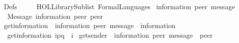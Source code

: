 %
\begin{isabellebody}%
%
%
\isadelimtheory
\isanewline
\isanewline
%
\endisadelimtheory
%
\isatagtheory
{}\isamarkupfalse%
\ Defs\isanewline
\ \ \ \ \ {\isachardoublequoteopen}HOL{\isacharminus}{\kern0pt}Library{\isachardot}{\kern0pt}Sublist{\isachardoublequoteclose}\ FormalLanguages\isanewline
{}%
\endisatagtheory
{\isafoldtheory}%
%
\isadelimtheory
%
\endisadelimtheory
%
\isadelimdocument
%
\endisadelimdocument
%
\isatagdocument
%
\isamarkuptrue%
%
\isamarkuptrue%
%
\isamarkuptrue%
%
\endisatagdocument
{\isafolddocument}%
%
\isadelimdocument
%
\endisadelimdocument
{}\isamarkupfalse%
\ {\isacharparenleft}{\kern0pt}{\isacharprime}{\kern0pt}information{\isacharcomma}{\kern0pt}\ {\isacharprime}{\kern0pt}peer{\isacharparenright}{\kern0pt}\ message\ {\isacharequal}{\kern0pt}\isanewline
\ \ Message\ {\isacharprime}{\kern0pt}information\ {\isacharprime}{\kern0pt}peer\ {\isacharprime}{\kern0pt}peer\ \ {\isacharparenleft}{\kern0pt}{\isachardoublequoteopen}{\isacharunderscore}{\kern0pt}\isactrlbsup {\isacharunderscore}{\kern0pt}{\isasymrightarrow}{\isacharunderscore}{\kern0pt}\isactrlesup {\isachardoublequoteclose}\ {\isacharbrackleft}{\kern0pt}{}{}{}{\isacharcomma}{\kern0pt}\ {}{}{}{\isacharcomma}{\kern0pt}\ {}{}{}{\isacharbrackright}{\kern0pt}\ {}{}{}{\isacharparenright}{\kern0pt}\isanewline
\isanewline
{}\isamarkupfalse%
\ get{\isacharunderscore}{\kern0pt}information\ {\isacharcolon}{\kern0pt}{\isacharcolon}{\kern0pt}\ {\isachardoublequoteopen}{\isacharparenleft}{\kern0pt}{\isacharprime}{\kern0pt}information{\isacharcomma}{\kern0pt}\ {\isacharprime}{\kern0pt}peer{\isacharparenright}{\kern0pt}\ message\ {\isasymRightarrow}\ {\isacharprime}{\kern0pt}information{\isachardoublequoteclose}\ \isanewline
\ \ {\isachardoublequoteopen}get{\isacharunderscore}{\kern0pt}information\ {\isacharparenleft}{\kern0pt}i\isactrlbsup p{\isasymrightarrow}q\isactrlesup {\isacharparenright}{\kern0pt}\ {\isacharequal}{\kern0pt}\ i{\isachardoublequoteclose}\isanewline
\isanewline
{}\isamarkupfalse%
\ get{\isacharunderscore}{\kern0pt}sender\ {\isacharcolon}{\kern0pt}{\isacharcolon}{\kern0pt}\ {\isachardoublequoteopen}{\isacharparenleft}{\kern0pt}{\isacharprime}{\kern0pt}information{\isacharcomma}{\kern0pt}\ {\isacharprime}{\kern0pt}peer{\isacharparenright}{\kern0pt}\ message\ {\isasymRightarrow}\ {\isacharprime}{\kern0pt}peer{\isachardoublequoteclose}\ \isanewline

\end{isabellebody}
